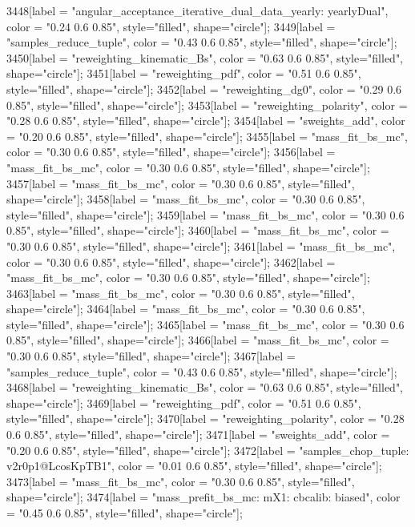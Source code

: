 {	3448[label = "angular_acceptance_iterative_dual_data_yearly\nangacc: yearlyDual", color = "0.24 0.6 0.85", style="filled", shape="circle"];
	3449[label = "samples_reduce_tuple", color = "0.43 0.6 0.85", style="filled", shape="circle"];
	3450[label = "reweighting_kinematic_Bs", color = "0.63 0.6 0.85", style="filled", shape="circle"];
	3451[label = "reweighting_pdf", color = "0.51 0.6 0.85", style="filled", shape="circle"];
	3452[label = "reweighting_dg0", color = "0.29 0.6 0.85", style="filled", shape="circle"];
	3453[label = "reweighting_polarity", color = "0.28 0.6 0.85", style="filled", shape="circle"];
	3454[label = "sweights_add", color = "0.20 0.6 0.85", style="filled", shape="circle"];
	3455[label = "mass_fit_bs_mc", color = "0.30 0.6 0.85", style="filled", shape="circle"];
	3456[label = "mass_fit_bs_mc", color = "0.30 0.6 0.85", style="filled", shape="circle"];
	3457[label = "mass_fit_bs_mc", color = "0.30 0.6 0.85", style="filled", shape="circle"];
	3458[label = "mass_fit_bs_mc", color = "0.30 0.6 0.85", style="filled", shape="circle"];
	3459[label = "mass_fit_bs_mc", color = "0.30 0.6 0.85", style="filled", shape="circle"];
	3460[label = "mass_fit_bs_mc", color = "0.30 0.6 0.85", style="filled", shape="circle"];
	3461[label = "mass_fit_bs_mc", color = "0.30 0.6 0.85", style="filled", shape="circle"];
	3462[label = "mass_fit_bs_mc", color = "0.30 0.6 0.85", style="filled", shape="circle"];
	3463[label = "mass_fit_bs_mc", color = "0.30 0.6 0.85", style="filled", shape="circle"];
	3464[label = "mass_fit_bs_mc", color = "0.30 0.6 0.85", style="filled", shape="circle"];
	3465[label = "mass_fit_bs_mc", color = "0.30 0.6 0.85", style="filled", shape="circle"];
	3466[label = "mass_fit_bs_mc", color = "0.30 0.6 0.85", style="filled", shape="circle"];
	3467[label = "samples_reduce_tuple", color = "0.43 0.6 0.85", style="filled", shape="circle"];
	3468[label = "reweighting_kinematic_Bs", color = "0.63 0.6 0.85", style="filled", shape="circle"];
	3469[label = "reweighting_pdf", color = "0.51 0.6 0.85", style="filled", shape="circle"];
	3470[label = "reweighting_polarity", color = "0.28 0.6 0.85", style="filled", shape="circle"];
	3471[label = "sweights_add", color = "0.20 0.6 0.85", style="filled", shape="circle"];
	3472[label = "samples_chop_tuple\nversion: v2r0p1@LcosKpTB1", color = "0.01 0.6 0.85", style="filled", shape="circle"];
	3473[label = "mass_fit_bs_mc", color = "0.30 0.6 0.85", style="filled", shape="circle"];
	3474[label = "mass_prefit_bs_mc\nmassbin: mX1\nmassmodel: cbcalib\ntrigger: biased", color = "0.45 0.6 0.85", style="filled", shape="circle"];
}
